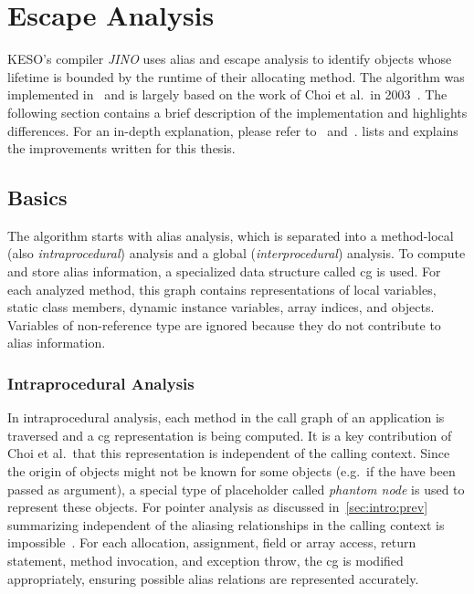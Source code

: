 
\chapter{Escape Analysis}
	\label{chapter:ea}
	KESO's compiler \emph{JINO} uses alias and escape analysis to identify objects whose lifetime is bounded by the
	runtime of their allocating method. The algorithm was implemented in~\cite{lang:12} and is largely based on the work
	of Choi et al.\ in 2003~\cite{choi:03:toplas}. The following section contains a brief description of the
	implementation and highlights differences. For an in-depth explanation, please refer to~\cite{lang:12}
	and~\cite{choi:03:toplas}.  lists and explains the improvements written for this thesis.

	\section{Basics}
		\label{sec:ea:basics}
		The algorithm starts with alias analysis, which is separated into a method-local (also \emph{intraprocedural})
		analysis and a global (\emph{interprocedural}) analysis. To compute and store alias information, a specialized data
		structure called \gls{cg} is used. For each analyzed method, this graph contains representations of local variables,
		static class members, dynamic instance variables, array indices, and objects. Variables of non-reference type are
		ignored because they do not contribute to alias information.

		\subsection{Intraprocedural Analysis}
			\label{sub:ea:basics:local}
			In intraprocedural analysis, each method in the call graph of an application is traversed and a \gls{cg}
			representation is being computed. It is a key contribution of Choi et al.\ that this representation is independent
			of the calling context. Since the origin of objects might not be known for some objects (e.g.\ if the have been
			passed as argument), a special type of placeholder called \emph{phantom node} is used to represent these objects.
			For pointer analysis as discussed in~\cref{sec:intro:prev} summarizing independent of the aliasing relationships
			in the calling context is impossible~\cite[p.~886]{choi:03:toplas}. For each allocation, assignment, field or
			array access, return statement, method invocation, and exception throw, the \gls{cg} is modified appropriately,
			ensuring possible alias relations are represented accurately.


